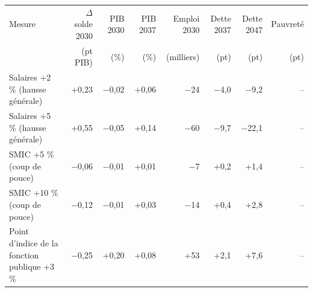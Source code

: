 \begin{tabular}{p{5.2cm}rrrrrrr}
\toprule
Mesure & $\Delta$solde 2030 & PIB 2030 & PIB 2037 & Emploi 2030 & Dette 2037 & Dette 2047 & Pauvreté \\
 & (pt PIB) & (\%) & (\%) & (milliers) & (pt) & (pt) & (pt) \\
\midrule
Salaires +2 \% (hausse générale) & +0{,}23 & $-$0{,}02 & +0{,}06 & $-$24 & $-$4{,}0 & $-$9{,}2 & -- \\
Salaires +5 \% (hausse générale) & +0{,}55 & $-$0{,}05 & +0{,}14 & $-$60 & $-$9{,}7 & $-$22{,}1 & -- \\
SMIC +5 \% (coup de pouce) & $-$0{,}06 & $-$0{,}01 & +0{,}01 & $-$7 & +0{,}2 & +1{,}4 & -- \\
SMIC +10 \% (coup de pouce) & $-$0{,}12 & $-$0{,}01 & +0{,}03 & $-$14 & +0{,}4 & +2{,}8 & -- \\
Point d'indice de la fonction publique +3 \% & $-$0{,}25 & +0{,}20 & +0{,}08 & +53 & +2{,}1 & +7{,}6 & -- \\
\bottomrule
\end{tabular}
